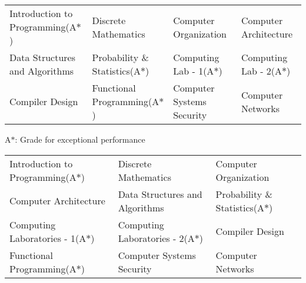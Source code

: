 
\ifdefined\ONEPAGE

\begin{tabular*}{\textwidth}{l l l l}
  Introduction to Programming(A$*$) & Discrete Mathematics  & Computer
                                                              Organization &
                                                                             Computer Architecture \\
  Data Structures and Algorithms & Probability \& Statistics(A$*$) & Computing
                                                                     Lab
                                                                     - 1(A$*$) &
                                                                                 Computing
                                                                                 Lab
                                                                                 -
                                                                                 2(A$*$) \\
  Compiler Design &  Functional Programming(A$*$) & Computer Systems Security & Computer Networks
\end{tabular*}





{\footnotesize
    {A$*$: Grade for exceptional performance}
}

\else
{\fontsize{11pt}{1em}\bodyfontlight\upshape\color{text}
  \begin{tabular*}{\textwidth}{l l l}
    Introduction to Programming(A$*$) & Discrete Mathematics  & Computer Organization \\
    Computer Architecture & Data Structures and Algorithms & Probability \& Statistics(A$*$) \\
    Computing Laboratories - 1(A$*$) & Computing Laboratories - 2(A$*$) & Compiler Design \\
    Functional Programming(A$*$) & Computer Systems Security & Computer Networks
  \end{tabular*}
}
{\fontsize{11pt}{1em}\footerfont\upshape\color{text}
  \\
}
\vspace{-0.5cm}

\fi

